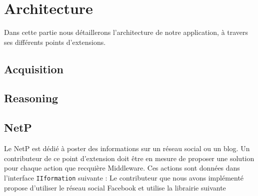 \chapter{Architecture}
Dans cette partie nous détaillerons l'architecture de notre application, à travers ses différents points d'extensions.
\section{Acquisition}

\section{Reasoning}

\section{NetP}
Le  NetP est dédié à poster des informations sur un  réseau social ou un blog. Un contributeur de ce point d'extension doit être en mesure de proposer une solution pour chaque action que recquière Middleware. Ces actions sont données dans l'interface \verb+IIformation+ suivante :
Le contributeur que nous avons implémenté propose d'utiliser le réseau social Facebook et utilise la librairie suivante \cite{restFB}





